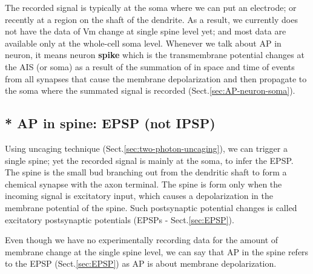 The recorded signal is typically at the soma where we can put an electrode; or
recently at a region on the shaft of the dendrite.
As a result, we currently does not have the data of Vm change at single spine
level yet; and most data are available only at the whole-cell soma level.
Whenever we talk about AP in neuron, it means neuron {\bf spike} which is the
transmembrane potential changes at the AIS (or soma) as a result of the
summation of in space and time of events from all synapses that cause the
membrane depolarization and then propagate to the soma where the summated signal
is recorded (Sect.\ref{sec:AP-neuron-soma}).
 


\subsection{* AP in spine: EPSP (not IPSP)}
\label{sec:AP-synapse}

Using uncaging technique (Sect.\ref{sec:two-photon-uncaging}), we can trigger a
single spine; yet the recorded signal is mainly at the soma, to infer the EPSP. 
The spine is the small bud branching out from the dendritic shaft to form a
chemical synapse with the axon terminal. The spine is form only when the
incoming signal is excitatory input, which causes a depolarization in the
membrane potential of the spine. Such postsynaptic potential changes is called
excitatory postsynaptic potentials (EPSPs - Sect.\ref{sec:EPSP}).


Even though we have no experimentally recording data 
for the amount of membrane change at the single spine level, we can say that 
AP in the spine refers to the EPSP (Sect.\ref{sec:EPSP})
as AP is about membrane depolarization.

% 


